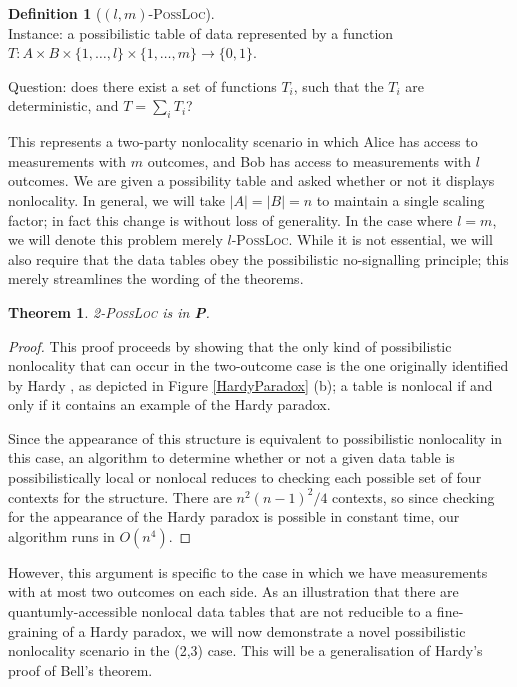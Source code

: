 \documentclass[reprint]{revtex4-1}
\newtheorem{thm}{Theorem}
\theoremstyle{definition}
\newtheorem{defn}{Definition}
\begin{document}
\begin{defn}[$(l,m)$-\textsc{PossLoc}]
\quad\\
Instance: a possibilistic table of data represented by a  function $T:A\times B \times \{1,\dots, l\}\times \{1,\dots, m\}\rightarrow\{0,1\}$.

Question: does there exist a set of functions $T_i$, such that the $T_i$ are deterministic, and $T=\sum_i T_i$?
\end{defn}
This represents a two-party nonlocality scenario in which Alice has access to measurements with $m$ outcomes, and Bob has access to measurements with $l$ outcomes. We are given a possibility table and asked whether or not it displays nonlocality. In general, we will take $|A|=|B|=n$ to maintain a single scaling factor; in fact this change is without loss of generality. In the case where $l=m$, we will denote this problem merely $l$-\textsc{PossLoc}. While it is not essential, we will also require that the data tables obey the possibilistic no-signalling principle; this merely streamlines the wording of the theorems. 
\begin{thm} \cite{Mans2017}
2-\textsc{PossLoc} is in \textbf{P}.
\end{thm}
\begin{proof}
This proof proceeds by showing that the only kind of possibilistic nonlocality that can occur in the two-outcome case is the one originally identified by Hardy \cite{Hard1993}, as depicted in Figure \ref{HardyParadox} (b); a table is nonlocal if and only if it contains an example of the Hardy paradox.

Since the appearance of this structure is equivalent to possibilistic nonlocality in this case, an algorithm to determine whether or not a given data table is possibilistically local or nonlocal reduces to checking each possible set of four contexts for the structure. There are $n^2(n-1)^2/4$ contexts, so since checking for the appearance of the Hardy paradox is possible in constant time, our algorithm runs in $O(n^4)$.
\end{proof}
However, this argument is specific to the case in which we have measurements with at most two outcomes on each side. As an illustration that there are quantumly-accessible nonlocal data tables that are not reducible to a fine-graining of a Hardy paradox, we will now demonstrate a novel possibilistic nonlocality scenario in the (2,3) case. This will be a generalisation of Hardy's proof of Bell's theorem.
\end{document}

